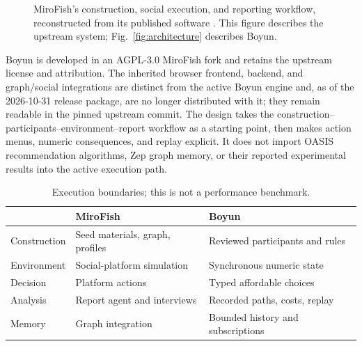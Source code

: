 \begin{figure}[t]
\centering
{}
\caption{MiroFish's construction, social execution, and reporting workflow,
reconstructed from its published software \cite{mirofish}. This figure describes
the upstream system; Fig.~\ref{fig:architecture} describes Boyun.}
\label{fig:mirofish}
\end{figure}

Boyun is developed in an AGPL-3.0 MiroFish fork and retains the upstream
license and attribution. The inherited browser frontend, backend, and
graph/social integrations are distinct from the active Boyun engine and, as of
the 2026-10-31 release package, are no longer distributed with it; they remain
readable in the pinned upstream commit. The
design takes the construction--participants--environment--report workflow
as a starting point, then makes action menus, numeric consequences, and replay
explicit. It does not import OASIS recommendation algorithms, Zep graph memory,
or their reported experimental results into the active execution path.

\begin{table}[t]
\caption{Execution boundaries; this is not a performance benchmark.}
\label{tab:comparison}
\centering\footnotesize
\begin{tabularx}{\columnwidth}{@{}p{}YY@{}}
\toprule & MiroFish & Boyun \\
\midrule
Construction & Seed materials, graph, profiles & Reviewed participants and rules \\
Environment & Social-platform simulation & Synchronous numeric state \\
Decision & Platform actions & Typed affordable choices \\
Analysis & Report agent and interviews & Recorded paths, costs, replay \\
Memory & Graph integration & Bounded history and subscriptions \\
\bottomrule
\end{tabularx}
\end{table}

